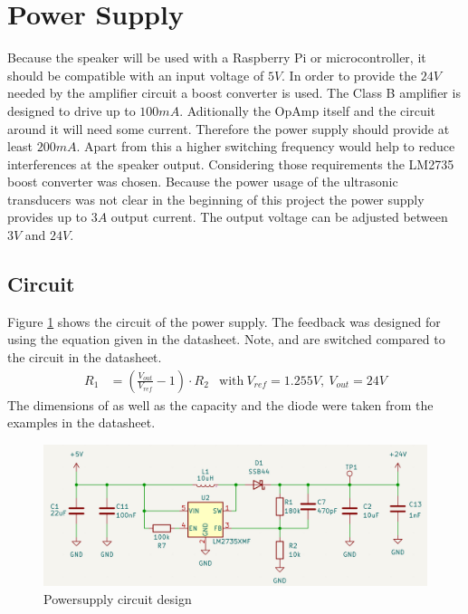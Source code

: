 \section{Power Supply}


Because the speaker will be used with a Raspberry Pi or microcontroller, it should be compatible with an input voltage of $5V$. In order to provide the $24V$ needed by the amplifier circuit a boost converter is used.\p
The Class B amplifier is designed to drive up to $100mA$. Aditionally the OpAmp itself and the circuit around it will need some current. Therefore the power supply should provide at least $200mA$. Apart from this a higher switching frequency would help to reduce interferences at the speaker output.\p
%
Considering those requirements the LM2735 boost converter was chosen. Because the power usage of the ultrasonic transducers was not clear in the beginning of this project the power supply provides up to $3A$ output current. The output voltage can be adjusted between $3V$ and $24V$.\cite{texas_instruments_lm2735-q1_2018}

\subsection{Circuit}

Figure \ref{fig:pcb:power_circuit} shows the circuit of the power supply. The feedback was designed for using the equation given in the datasheet.
Note,  and  are switched compared to the circuit in the datasheet.
%
\begin{align}
  R_1 &= \left(\frac{V_{out}}{V_{ref}} - 1\right) \cdot R_2
  &\mathrm{with~} V_{ref} = 1.255V,~V_{out} = 24V
\end{align}
%
The dimensions of  as well as the capacity  and the diode  were taken from the examples in the datasheet.
%
\begin{figure}
  \centering
  \includegraphics[width=\textwidth]{src/assets/pictures/circuit/powersupply_circuit.png}
  \caption{Powersupply circuit design}\label{fig:pcb:power_circuit}
\end{figure}